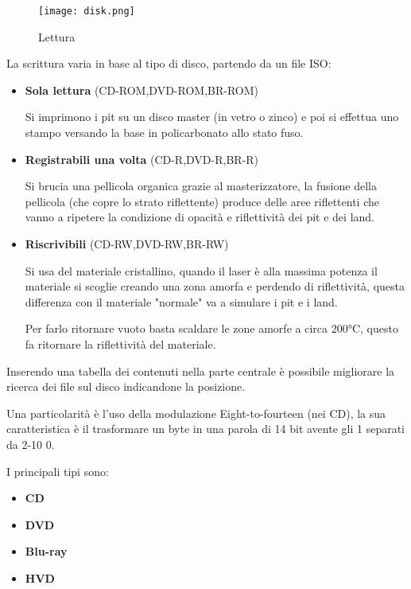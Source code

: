 \documentclass{article}
\begin{document}
\begin{figure}[ht]
    \centering
    \texttt{[image: disk.png]}
    \caption{Lettura}
    \label{fig:disk}
\end{figure}

\noindent La scrittura varia in base al tipo di disco, partendo da un file ISO:
\begin{itemize}
    \item \textbf{Sola lettura} (CD-ROM,DVD-ROM,BR-ROM)
    
        Si imprimono i pit su un disco master (in vetro o 
        zinco) e poi si effettua uno stampo versando la base in 
        policarbonato allo stato fuso.

    \item \textbf{Registrabili una volta} (CD-R,DVD-R,BR-R)

         Si brucia una pellicola organica grazie al masterizzatore, la fusione della pellicola (che copre lo strato riflettente) produce delle aree riflettenti che vanno a ripetere la condizione di opacità e riflettività dei pit e dei land.

        \item \textbf{Riscrivibili} (CD-RW,DVD-RW,BR-RW)

        Si usa del materiale cristallino, quando il laser è alla massima potenza il materiale si scoglie creando una zona amorfa e perdendo di riflettività, questa differenza con il materiale "normale" va a simulare i pit e i land. 
        
        
        Per farlo ritornare vuoto basta scaldare le zone amorfe a circa 200°C, questo fa ritornare la riflettività del materiale.\newline
    
\end{itemize}

\noindent Inserendo una tabella dei contenuti nella parte centrale è possibile migliorare la ricerca dei file sul disco indicandone la posizione.\newline

\noindent Una particolarità è l'uso della modulazione Eight-to-fourteen (nei CD), la sua caratteristica è il trasformare un byte in una parola di 14 bit avente gli 1 separati da 2-10 0.\newline

\noindent I principali tipi sono:
\begin{itemize}
    \item \textbf{CD}
    \item \textbf{DVD}
    \item \textbf{Blu-ray}
    \item \textbf{HVD}
\end{itemize}
\end{document}
